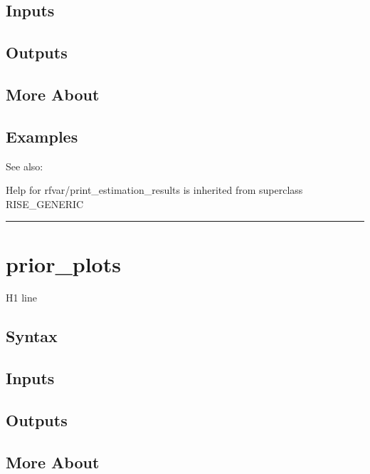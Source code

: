 \documentclass[letterpaper,10pt,english]{sphinxmanual}
\begin{document}
\subsection{Inputs}
\label{classes/models/@rfvar/rfvar:id93}

\subsection{Outputs}
\label{classes/models/@rfvar/rfvar:id94}

\subsection{More About}
\label{classes/models/@rfvar/rfvar:id95}

\subsection{Examples}
\label{classes/models/@rfvar/rfvar:id96}
See also:

Help for rfvar/print\_estimation\_results is inherited from superclass RISE\_GENERIC


\bigskip\hrule{}\bigskip



\section{prior\_plots}
\label{classes/models/@rfvar/rfvar:prior-plots}\label{classes/models/@rfvar/rfvar:id97}
H1 line


\subsection{Syntax}
\label{classes/models/@rfvar/rfvar:id98}

\subsection{Inputs}
\label{classes/models/@rfvar/rfvar:id99}

\subsection{Outputs}
\label{classes/models/@rfvar/rfvar:id100}

\subsection{More About}
\label{classes/models/@rfvar/rfvar:id101}
\end{document}
